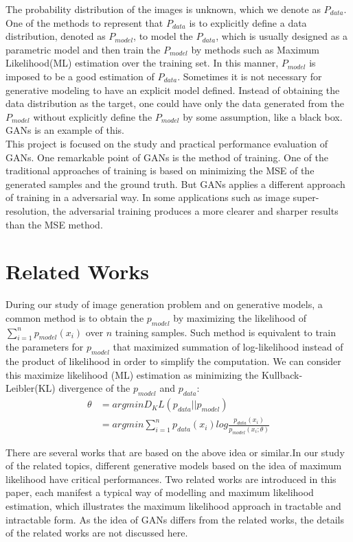 \documentclass[10pt,twocolumn,letterpaper]{article}
\begin{document}
The probability distribution of the images is unknown, which we denote as $P_{data}$. One of the methods to represent that $P_{data}$ is to explicitly define a data distribution, denoted as $P_{model}$, to model the $P_{data}$, which is usually designed as a parametric model and then train the $P_{model}$ by methods such as Maximum Likelihood(ML) estimation over the training set. In this manner, $P_{model}$ is imposed to be a good estimation of $P_{data}$. Sometimes it is not necessary for generative modeling to have an explicit model defined. Instead of obtaining the data distribution as the target, one could have only the data generated from the $P_{model}$ without explicitly define the $P_{model}$ by some assumption, like a black box. GANs\cite{goodfellow2014generative} is an example of this.\\

This project is focused on the study and practical performance evaluation of GANs. One remarkable point of GANs is the method of training. One of the traditional approaches of training is based on minimizing the MSE of the generated samples and the ground truth. But GANs applies a different approach of training in a adversarial way. In some applications such as image super-resolution, the adversarial training produces a more clearer and sharper results than the MSE method.\cite{goodfellow2016nips}

\section{Related Works}

During our study of image generation problem and on generative models, a common method is to obtain the $p_{model}$ by maximizing the likelihood of $\sum_{i=1}^{n}p_{model}(x_i)$ over $n$ training samples. Such method is equivalent to train the parameters for $p_{model}$ that maximized summation of log-likelihood instead of the product of likelihood in order to simplify the computation. We can consider this  maximize likelihood (ML) estimation as minimizing the Kullback-Leibler(KL) divergence of the $p_{model}$ and $p_{data}$:
\begin{align}
\theta &= argminD_KL(p_{data}||p_{model})\nonumber \\
&= argmin\sum_{i=1}^{n}p_{data}(x_i)log\frac{p_{data}(x_i)}{p_{model}(x_i;\theta)}
\end{align}

There are several works that are based on the above idea or similar.In our study of the related topics, different generative models based on the idea of maximum likelihood have critical performances. Two related works are introduced in this paper, each manifest a typical way of modelling and maximum likelihood estimation, which illustrates the maximum likelihood approach in tractable and intractable form. As the idea of GANs differs from the related works, the details of the related works are not discussed here.
\end{document}
